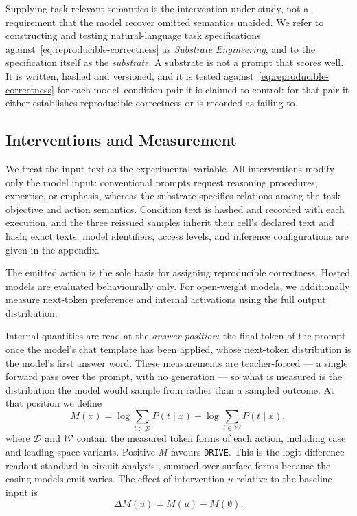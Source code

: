 Supplying task-relevant semantics is the intervention under study, not
a requirement that the model recover omitted semantics unaided. We
refer to constructing and testing natural-language task specifications
against~\eqref{eq:reproducible-correctness} as \emph{Substrate
Engineering}, and to the specification itself as the \emph{substrate}.
A substrate is not a prompt that scores well. It is written, hashed and
versioned, and it is tested against~\eqref{eq:reproducible-correctness}
for each model--condition pair it is claimed to control: for that pair it
either establishes reproducible correctness or is recorded as failing to.


\subsection{Interventions and Measurement}
\label{sec:interventions-measurement}

We treat the input text as the experimental variable. All
interventions modify only the model input: conventional prompts request
reasoning procedures, expertise, or emphasis, whereas the substrate
specifies relations among the task objective and action semantics.
Condition text is hashed and recorded with each execution, and the
three reissued samples inherit their cell's declared text and hash;
exact texts, model identifiers, access levels, and inference
configurations are given in the appendix.

The emitted action is the sole basis for assigning reproducible
correctness. Hosted models are evaluated behaviourally only. For
open-weight models, we additionally measure next-token preference and
internal activations using the full output distribution.

Internal quantities are read at the \emph{answer position}: the final
token of the prompt once the model's chat template has been applied,
whose next-token distribution is the model's first answer word. These
measurements are teacher-forced --- a single forward pass over the
prompt, with no generation --- so what is measured is the distribution
the model would sample from rather than a sampled outcome. At that
position we define
\begin{equation}
    M(x) = \log \sum_{t \in \mathcal{D}} P(t \mid x)
         - \log \sum_{t \in \mathcal{W}} P(t \mid x),
    \label{eq:decision-margin}
\end{equation}
where $\mathcal{D}$ and $\mathcal{W}$ contain the measured token forms
of each action, including case and leading-space variants. Positive
$M$ favours \texttt{DRIVE}. This is the logit-difference readout
standard in circuit analysis \citep{wang2023interpretability}, summed
over surface forms because the casing models emit varies. The effect of intervention $u$ relative
to the baseline input is
\begin{equation}
    \Delta M(u) = M(u) - M(\emptyset).
    \label{eq:intervention-effect}
\end{equation}

